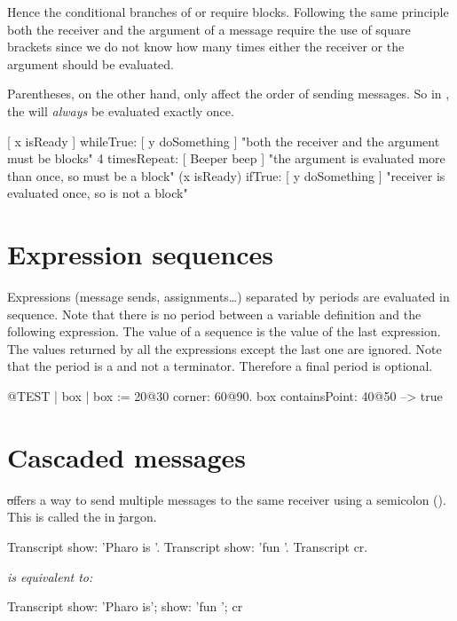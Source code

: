 \documentclass[a4paper,10pt,twoside]{book}
\begin{document}
Hence the conditional branches of  or  require blocks. Following the same principle both the receiver and the argument of a  message require the use of square brackets since we do not know how many times either the receiver or the argument should be evaluated.

Parentheses, on the other hand, only affect the order of sending messages.
So in , the  will \emph{always} be evaluated exactly once.

\begin{code}{}
[ x isReady ] whileTrue: [ y doSomething ]   "both the receiver and the argument must be blocks"
4 timesRepeat: [ Beeper beep ]                   "the argument is evaluated more than once, so must be a block"
(x isReady) ifTrue: [ y doSomething ]           "receiver is evaluated once, so is not a block"
\end{code}

\section{Expression sequences}
Expressions (\ie message sends, assignments\dots) separated by periods are evaluated in sequence.
Note that there is no period between a variable definition and the following expression.
The value of a sequence is the value of the last expression. The values returned by all the 
expressions except the last one are ignored. Note that the period is a  and not a terminator. Therefore a final period is optional.

\begin{code}{@TEST}
| box |
box := 20@30 corner: 60@90.
box containsPoint: 40@50 --> true
\end{code}

\section{Cascaded messages}
\st offers a way to send multiple messages to the same receiver using a semicolon (\ct{;}). This is called the  in \st jargon.


\begin{minipage}{0.35\textwidth}
\begin{code}{}
Transcript show: 'Pharo is '.
Transcript show: 'fun '.
Transcript cr.
\end{code}
\end{minipage}
\emph{is equivalent to:}
\begin{minipage}{0.35\textwidth}
\begin{code}{}
Transcript        
   show: 'Pharo is';
   show: 'fun ';
   cr
\end{code}
\end{minipage}
\end{document}
